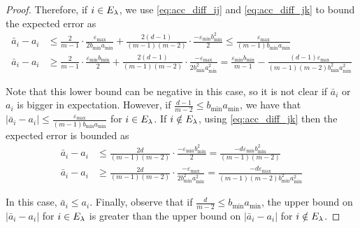\begin{proof}
Therefore, if $i \in E_{\lambda}$, we use \eqref{eq:acc_diff_ij} and \eqref{eq:acc_diff_jk} to bound the expected error as
\begin{align*}
\bar{a}_i - a_i &\le \frac{2}{m - 1} \cdot \frac{\varepsilon_{\max}}{2b_{\min} a_{\min}} + \frac{2(d - 1)}{(m - 1)(m - 2)} \cdot \frac{-\varepsilon_{\min} b_{\min}^2}{2} \le \frac{\varepsilon_{\max}}{(m - 1) b_{\min} a_{\min}} \\
\bar{a}_i - a_i &\ge \frac{2}{m - 1} \cdot \frac{\varepsilon_{\min} b_{\min}}{2} + \frac{2(d - 1)}{(m - 1)(m - 2)} \cdot \frac{-\varepsilon_{\max}}{2 b_{\min}^2 a_{\min}^2} = \frac{\varepsilon_{\min} b_{\min}}{m - 1} - \frac{(d - 1)\varepsilon_{\max}}{(m - 1)(m - 2)b^2_{\min} a^2_{\min}}
\end{align*}

Note that this lower bound can be negative in this case, so it is not clear if $\bar{a}_i$ or $a_i$ is bigger in expectation. However, if $\frac{d - 1}{m - 2} \le b_{\min} a_{\min}$, we have that $|\bar{a}_i - a_i| \le \frac{\varepsilon_{\max}}{(m - 1)b_{\min} a_{\min}}$ for $i \in E_{\lambda}$. If $i \notin E_{\lambda}$, using \eqref{eq:acc_diff_jk} then the expected error is bounded as
\begin{align*}
\bar{a}_i - a_i &\le \frac{2d}{(m - 1)(m - 2)} \cdot \frac{-\varepsilon_{\min} b_{\min}^2}{2} = \frac{-d\varepsilon_{\min} b_{\min}^2 }{(m - 1)(m - 2)}  \\
\bar{a}_i - a_i &\ge \frac{2d}{(m - 1)(m - 2)}  \cdot \frac{-\varepsilon_{\max}}{2 b_{\min}^2 a_{\min}^2} = \frac{-d \varepsilon_{\max}}{(m - 1)(m - 2) b_{\min}^2 a_{\min}^2} 
\end{align*}

In this case, $\bar{a}_i \le a_i$. Finally, observe that if $\frac{d}{m - 2} \le b_{\min} a_{\min}$, the upper bound on $|\bar{a}_i - a_i|$ for $i \in E_{\lambda}$ is greater than the upper bound on $|\bar{a}_i - a_i|$ for $i \notin E_{\lambda}$.

\end{proof}

